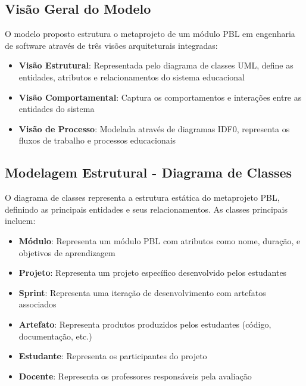 \documentclass[english, spanish, brazilian]{RBIEarticle} %
\begin{document}
\subsection{Visão Geral do Modelo}

O modelo proposto estrutura o metaprojeto de um módulo PBL em engenharia de software através de três visões arquiteturais integradas:

\begin{itemize}
    \item \textbf{Visão Estrutural}: Representada pelo diagrama de classes UML, define as entidades, atributos e relacionamentos do sistema educacional
    \item \textbf{Visão Comportamental}: Captura os comportamentos e interações entre as entidades do sistema
    \item \textbf{Visão de Processo}: Modelada através de diagramas IDF0, representa os fluxos de trabalho e processos educacionais
\end{itemize}

\subsection{Modelagem Estrutural - Diagrama de Classes}

O diagrama de classes representa a estrutura estática do metaprojeto PBL, definindo as principais entidades e seus relacionamentos. As classes principais incluem:

\begin{itemize}
    \item \textbf{Módulo}: Representa um módulo PBL com atributos como nome, duração, e objetivos de aprendizagem
    \item \textbf{Projeto}: Representa um projeto específico desenvolvido pelos estudantes
    \item \textbf{Sprint}: Representa uma iteração de desenvolvimento com artefatos associados
    \item \textbf{Artefato}: Representa produtos produzidos pelos estudantes (código, documentação, etc.)
    \item \textbf{Estudante}: Representa os participantes do projeto
    \item \textbf{Docente}: Representa os professores responsáveis pela avaliação
\end{itemize}
\end{document}
